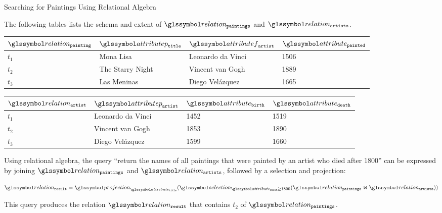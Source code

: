 \begin{example}[label=example:rel_alg_query]{Searching for Paintings Using Relational Algebra}{}

    The following tables lists the schema and extent of $\relation_{\mathtt{paintings}}$ and $\relation_{\mathtt{artists}}$.

    \begin{center}
        \begin{tabular}{ l || l | l | l |}
            $\relation_{\mathtt{painting}}$ & $\attributep_{\mathtt{title}}$  & $\attributef_{\mathtt{artist}}$  & $\attribute_{\mathtt{painted}}$ \\ 
            \hline
            \hline
            $t_1$ & Mona Lisa &  Leonardo da Vinci & 1506 \\
            \hline
            $t_2$ & The Starry Night & Vincent van Gogh & 1889 \\
            \hline
            $t_3$ & Las Meninas & Diego Velázquez & 1665 \\
            \hline
        \end{tabular}
    \end{center}

    \begin{center}
        \begin{tabular}{ l || l | l | l |}
            $\relation_{\mathtt{artist}}$ & $\attributep_{\mathtt{artist}}$ & $\attribute_{\mathtt{birth}}$ & $\attribute_{\mathtt{death}}$\\ 
            \hline
            \hline
            $t_1$ & Leonardo da Vinci & 1452 & 1519 \\
            \hline
            $t_2$ & Vincent van Gogh & 1853 & 1890 \\
            \hline
            $t_3$ & Diego Velázquez & 1599 & 1660 \\
            \hline
        \end{tabular}
    \end{center}

    Using relational algebra, the query ``return the names of all paintings that were painted by an artist who died after 1800'' can be expressed by joining $\relation_{\mathtt{paintings}}$ and $\relation_{\mathtt{artists}}$, followed by a selection and projection:

    \begin{equation*}
        \relation_{\mathtt{result}} = \projection_{\attribute_{\mathtt{title}}} (\selection_{\attribute_{\mathtt{death}} \geq 1800}(\relation_{\mathtt{paintings}} \Join \relation_{\mathtt{artists}}))
    \end{equation*}

 This query produces the relation $\relation_{\mathtt{result}}$ that contains $t_2$ of $\relation_{\mathtt{paintings}}$.
\end{example}

